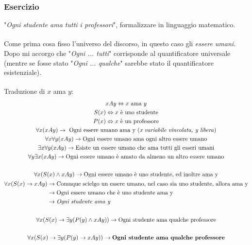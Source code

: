 \documentclass[italian]{article}
\begin{document}
\subsubsection{Esercizio}
"\textit{Ogni studente ama tutti i professori}", formalizzare in linguaggio matematico.\\\\
Come prima cosa fisso l'universo del discorso, in questo caso gli \textit{essere umani}.\\
Dopo mi accorgo che "\textit{Ogni ... tutti}" corrisponde al quantificatore universale (mentre se fosse stato "\textit{Ogni ... qualche}" sarebbe stato il quantificatore esistenziale).\\\\
Traduzione di $x$ ama $y$: 
\begin{gather*}
	xAy \Leftrightarrow x \text{ ama } y \\
	S(x) \Leftrightarrow x\text{ è uno studente} \\
	P(x) \Leftrightarrow x\text{ è un professore} \\
	\forall x(xAy) \to \text{ Ogni essere umano ama y (\textit{x variabile vincolata, y libera})} \\
	\forall x \forall y (xAy) \to \text{Ogni essere umano ama ogni altro essere umano} \\
	\exists x \forall y (xAy) \to \text{Esiste un essere umano che ama tutti gli esseri umani}\\
	\forall y \exists x (xAy) \to \text{Ogni essere umano è amato da almeno un altro essere umano}\\\\
	\forall x (S(x) \land xAy) \to \text{Ogni essere umano è uno studente, ed inoltre ama y} \\
	\begin{split}
		\forall x (S(x) \to xAy) &\to \text{Comuque scielgo un essere umano, nel caso sia uno studente, allora ama y} \\
		& \to \text{Ogni essere umano che è uno studente ama y} \\
		& \to \textit{Ogni studente ama y}
	\end{split}\\\\
	\forall x (S(x)\to \exists y (P(y) \land xAy)) \to \text{Ogni studente ama qualche professore} \\\\
	\forall x(S(x)\to \exists y (P(y) \to xAy)) \to \textbf{Ogni studente ama qualche professore}
\end{gather*}
\pagebreak
\end{document}
